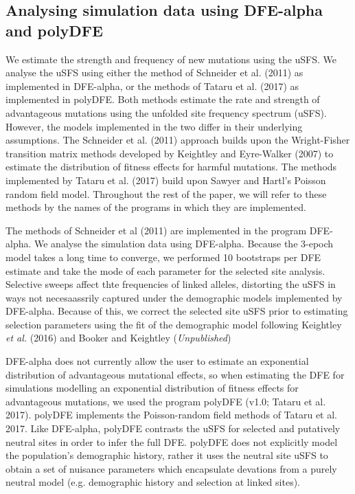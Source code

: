 \documentclass[11pt]{article}
\begin{document}
	\subsection*{Analysing simulation data using DFE-alpha and polyDFE}

	We estimate the strength and frequency of new mutations using the uSFS. We analyse the uSFS using either the method of Schneider et al. (2011) as implemented in DFE-alpha, or the methods of Tataru et al. (2017) as implemented in polyDFE. Both methods estimate the rate and strength of advantageous mutations using the unfolded site frequency spectrum (uSFS). However, the models implemented in the two differ in their underlying assumptions. The Schneider et al. (2011) approach builds upon the Wright-Fisher transition matrix methods developed by Keightley and Eyre-Walker (2007) to estimate the distribution of fitness effects for harmful mutations. The methods implemented by Tataru et al. (2017) build upon Sawyer and Hartl’s Poisson random field model.
Throughout the rest of the paper, we will refer to these methods by the names of the programs in which they are implemented.




		The methods of Schneider et al (2011) are implemented in the program DFE-alpha. We analyse the simulation data using DFE-alpha. Because the 3-epoch model takes a long time to converge, we performed 10 bootstraps per DFE estimate and take the mode of each parameter for the selected site analysis. Selective sweeps affect thte frequencies of linked alleles, distorting the uSFS in ways not necesaassrily captured under the demographic models implemented by DFE-alpha. Because of this, we correct the selected site uSFS prior to estimating selection parameters using the fit of the demographic model following Keightley \textit{et al.} (2016) and Booker and Keightley (\textit{Unpublished})
			
		DFE-alpha does not currently allow the user to estimate an exponential distribution of advantageous mutational effects, so when estimating the DFE for simulations modelling an exponential distribution of fitness effects for advantageous mutations, we used the program polyDFE (v1.0; Tataru et al. 2017). polyDFE implements the Poisson-random field methods of Tataru et al. 2017. Like DFE-alpha, polyDFE contrasts the uSFS for selected and putatively neutral sites in order to infer the full DFE. polyDFE does not explicitly model the population's demographic history, rather it uses the neutral site uSFS to obtain a set of nuisance parameters which encapsulate devations from a purely neutral model (e.g. demographic history and selection at linked sites).
		
\end{document}
